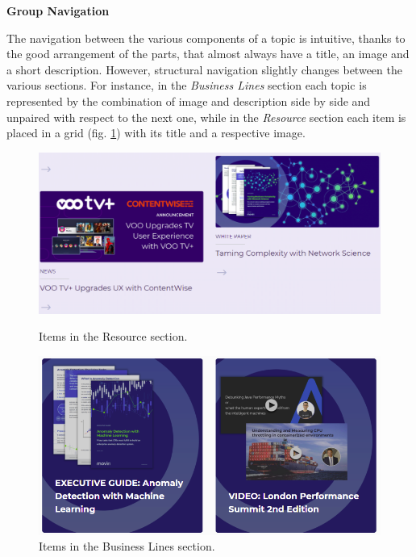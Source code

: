 \textbf{Group Navigation}\par
The navigation between the various components of a topic is intuitive, thanks to the good arrangement of the parts, that almost always have a title, an image and a short description. However, structural navigation slightly changes between the various sections. For instance, in the \textit{Business Lines} section each topic is represented by the combination of image and description side by side and unpaired with respect to the next one, while in the \textit{Resource} section each item is placed in a grid (fig. \ref{grid}) with its title and a respective image.
\medskip


\begin{figure}[H]
\centering
\begin{minipage}{.5\textwidth}
  \centering
  \includegraphics[scale=0.30]{images/structural_navigation.png}
    \caption{Items in the Resource section.}
  \label{grid}
\end{minipage}%
\begin{minipage}{.5\textwidth}
  \centering
  \includegraphics[scale=0.35]{images/structural_navigation_2.png}
        \caption{Items in the Business Lines section.}
\end{minipage}
\end{figure}


